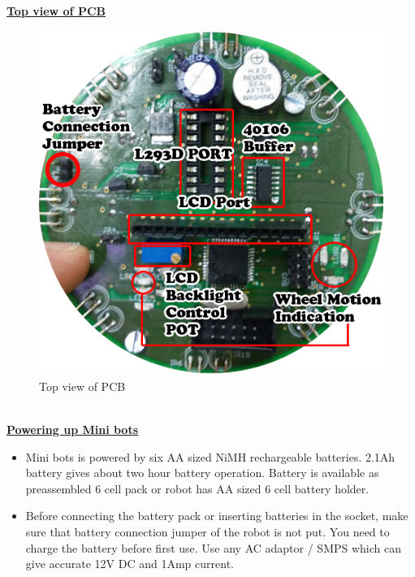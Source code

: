 \documentclass[a4paper,12pt,oneside]{book}
\begin{document}
	\hfill\\	
	\underline{\textbf{\Large{Top view of PCB}}}
	\begin{figure}[h!]
		\caption{Top view of PCB}
		\includegraphics[width=\textwidth]{./HardwareManual/Front.jpg}
	\end{figure}
	\hfill\\
	
	\underline{\textbf{\Large{Powering up Mini bots}}}
	\begin{itemize}
		\item{Mini bots is powered by six AA sized NiMH rechargeable batteries. 2.1Ah battery gives about
			two hour battery operation. Battery is available as preassembled 6 cell pack or robot has AA
			sized 6 cell battery holder.}
		\item{Before connecting the battery pack or inserting batteries in the socket, make sure that 	battery connection jumper of the robot is not put. You need to charge the battery before first use. Use any AC adaptor / SMPS	which can give accurate 12V DC and 1Amp current.}
	\end{itemize}
\end{document}
